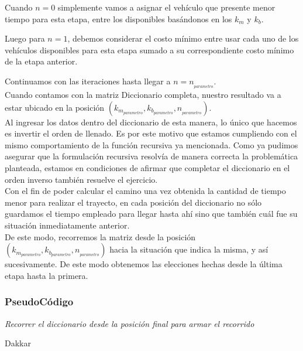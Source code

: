 Cuando $n=0$ simplemente vamos a asignar el veh\'iculo que presente menor tiempo para esta etapa, entre los disponibles bas\'andonos en los $k_m$ y $k_b$.

Luego para $n=1$, debemos considerar el costo m\'inimo entre usar cada uno de los veh\'iculos disponibles para esta etapa sumado a su correspondiente costo m\'inimo de la etapa anterior.

Continuamos con las iteraciones hasta llegar a $n=n_{_{parametro}}$.\\

Cuando contamos con la matriz Diccionario completa, nuestro resultado va a estar ubicado en la posici\'on $(k_{m_{parametro}},k_{b_{parametro}},n_{_{parametro}})$.\\

Al ingresar los datos dentro del diccionario de esta manera, lo \'unico que hacemos es invertir el orden de llenado. Es por este motivo que estamos cumpliendo con el mismo comportamiento de la funci\'on recursiva ya mencionada. Como ya pudimos asegurar que la formulaci\'on recursiva resolv\'ia de manera correcta la problem\'atica planteada, estamos en condiciones de afirmar que completar el diccionario en el orden inverso tambi\'en resuelve el ejercicio.\\

Con el fin de poder calcular el camino una vez obtenida la cantidad de tiempo menor para realizar el trayecto, en cada posici\'on del diccionario no s\'olo guardamos el tiempo empleado para llegar hasta ah\'i sino que tambi\'en cu\'al fue su situaci\'on inmediatamente anterior.\\

De este modo, recorremos la matriz  desde la posici\'on $(k_{m_{parametro}},k_{b_{parametro}},n_{_{parametro}})$ hacia la situaci\'on que indica la misma, y as\'i sucesivamente. De este modo obtenemos las elecciones hechas desde la \'ultima etapa hasta la primera.

\subsubsection*{PseudoC\'odigo}

\IncMargin{1em}
\begin{algorithm}
\BlankLine
\BlankLine
{}
\BlankLine
\emph{Recorrer el diccionario desde la posici\'on final para armar el recorrido}\;
\caption{Dakkar}%
\end{algorithm}\DecMargin{1em}

